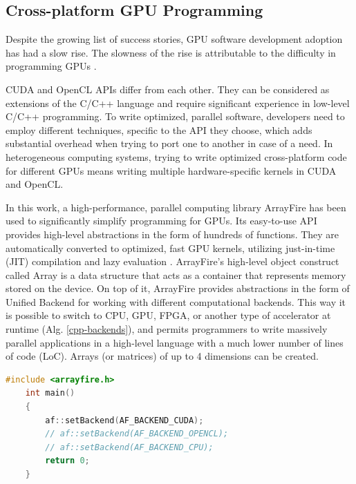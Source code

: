 \subsection{Cross-platform GPU Programming}
\label{sec:computer-simulations-using-gpus}

Despite the growing list of success stories, GPU software development adoption has had a slow rise. The slowness of the rise is attributable to the difficulty in programming GPUs \citep{malcolmArrayFireGPUAcceleration2012a}.

\citep{karimiPerformanceComparisonCUDAa}

CUDA and OpenCL APIs differ from each other. They can be considered as extensions of the C/C++ language and require significant experience in low-level C/C++ programming. To write optimized, parallel software, developers need to employ different techniques, specific to the API they choose, which adds substantial overhead when trying to port one to another in case of a need. In heterogeneous computing systems, trying to write optimized cross-platform code for different GPUs means writing multiple hardware-specific kernels in CUDA and OpenCL.

In this work, a high-performance, parallel computing library ArrayFire has been used to significantly simplify programming for GPUs. Its easy-to-use API provides high-level abstractions in the form of hundreds of functions. They are automatically converted to optimized, fast GPU kernels, utilizing just-in-time (JIT) compilation and lazy evaluation \cite{chrzeszczykMatrixComputationsGPUb}. ArrayFire's high-level object construct called Array is a data structure that acts as a container that represents memory stored on the device. On top of it, ArrayFire provides abstractions in the form of Unified Backend for working with different computational backends. This way it is possible to switch to CPU, GPU, FPGA, or another type of accelerator at runtime \cite{Yalamanchili2015} (Alg. \ref{cpp-backends}), and permits programmers to write massively parallel applications in a high-level language with a much lower number of lines of code (LoC). Arrays (or matrices) of up to 4 dimensions can be created. 

\begin{lstlisting}[language=Cpp, caption=C++ code for setting different computing backends., label=cpp-backends]
	#include <arrayfire.h>
	int main()
	{
		af::setBackend(AF_BACKEND_CUDA);
		// af::setBackend(AF_BACKEND_OPENCL);
		// af::setBackend(AF_BACKEND_CPU);
		return 0;
	}
\end{lstlisting}

